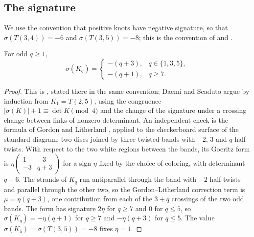 \subsection{The signature}\label{ss:sig}
We use the convention that positive knots have negative signature, so that $\sigma(T(3,4))=-6$ and
$\sigma(T(3,5))=-8$; this is the convention of \cite{HHK2} and \cite{WuebbenV}.

\begin{proposition}\label{prop:sig}
For odd $q\ge1$,
\[
 \sigma(K_q)=\begin{cases}-(q+3), & q\in\{1,3,5\},\\ -(q+1), & q\ge7.\end{cases}
\]
\end{proposition}

\begin{proof}
This is \cite[Lemma~8.29]{DS24}, stated there in the same convention; Daemi and Scaduto argue by
induction from $K_1=T(2,5)$, using the congruence $|\sigma(K)|+1\equiv\det K\pmod 4$ and the change of
the signature under a crossing change between links of nonzero determinant. An independent check is
the formula of Gordon and Litherland \cite[Thm.~6]{GordonLitherland}, applied to the checkerboard surface of the
standard diagram: two discs joined by three twisted bands with $-2$, $3$ and $q$ half-twists. With
respect to the two white regions between the bands, its Goeritz form is
$\eta\left(\begin{smallmatrix}1&-3\\-3&q+3\end{smallmatrix}\right)$ for a sign $\eta$ fixed by the
choice of coloring, with determinant $q-6$. The strands of $K_q$ run antiparallel through the band
with $-2$ half-twists and parallel through the other two, so the Gordon--Litherland correction term
is $\mu=\eta(q+3)$, one contribution from each of the $3+q$ crossings of the two odd bands. The
form has signature $2\eta$ for $q\ge7$ and $0$ for $q\le5$, so $\sigma(K_q)=-\eta(q+1)$ for
$q\ge7$ and $-\eta(q+3)$ for $q\le5$. The value $\sigma(K_5)=\sigma(T(3,5))=-8$ fixes
$\eta=1$.
\end{proof}

